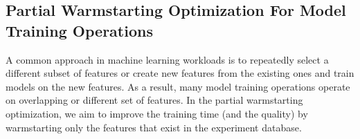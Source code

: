 \subsection{Partial Warmstarting Optimization For Model Training Operations}
A common approach in machine learning workloads is to repeatedly select a different subset of features or create new features from the existing ones and train models on the new features.
As a result, many model training operations operate on overlapping or different set of features.
In the partial warmstarting optimization, we aim to improve the training time (and the quality) by warmstarting only the features that exist in the experiment database.

%
%


